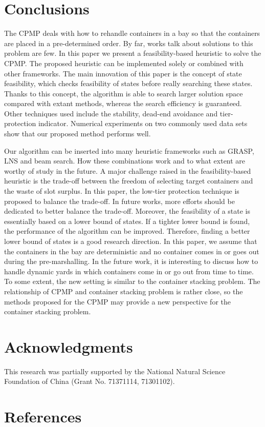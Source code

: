 \documentclass[review,3p,times,12pt,number]{elsarticle}\usepackage{amsmath}\usepackage{amssymb}
\begin{document}
\section{Conclusions}
\label{sec:conclusion}
The CPMP deals with how to rehandle containers in a bay so that the containers are placed in a pre-determined order. By far, works talk about solutions to this problem are few.
In this paper we present a feasibility-based heuristic to solve the CPMP\@. The proposed heuristic can be implemented solely or combined with other frameworks.
The main innovation of this paper is the concept of state feasibility, which checks feasibility of states before really searching these states. Thanks to this concept, the algorithm is able to search larger solution space compared with extant methods, whereas the search efficiency is guaranteed. Other techniques used include the stability, dead-end avoidance and tier-protection indicator.
Numerical experiments on two commonly used data sets show that our proposed method performs well.

Our algorithm can be inserted into many heuristic frameworks such as GRASP, LNS and beam search. How these combinations work and to what extent are worthy of study in the future.
A major challenge raised in the feasibility-based heuristic is the trade-off between the freedom of selecting target containers and the waste of slot surplus. In this paper, the low-tier protection technique is proposed to balance the trade-off. In future works, more efforts should be dedicated to better balance the trade-off. Moreover, the feasibility of a state is essentially based on a lower bound of states. If a tighter lower bound is found, the performance of the algorithm can be improved. Therefore, finding a better lower bound of states is a good research direction.
In this paper, we assume that the containers in the bay are deterministic and no container comes in or goes out during the pre-marshalling. In the future work, it is interesting to discuss how to handle dynamic yards in which containers come in or go out from time to time. To some extent, the new setting is similar to the container stacking problem. The relationship of CPMP and container stacking problem is rather close, so the methods proposed for the CPMP may provide a new perspective for the container stacking problem.

\section*{Acknowledgments}

This research was partially supported by the National Natural Science Foundation of China (Grant No. 71371114, 71301102).

\section*{References}



\end{document}
